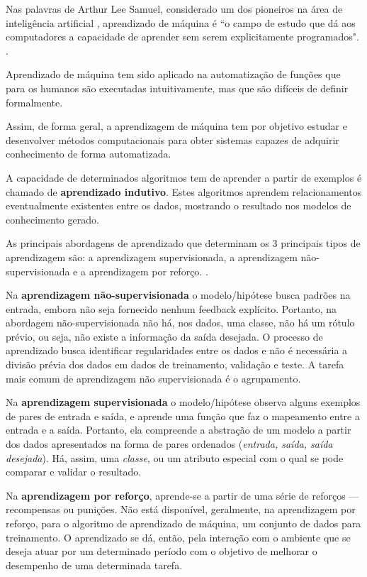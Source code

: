Nas palavras de Arthur Lee Samuel, considerado um dos pioneiros na área de inteligência artificial \cite{wiederhold_arthur_1992}, aprendizado de máquina é ``o campo de estudo que dá aos computadores a capacidade de aprender sem serem explicitamente programados". \cite[p. 89]{simon_too_2013}.

Aprendizado de máquina tem sido aplicado na automatização de funções que para os humanos são executadas intuitivamente, mas que são difíceis de definir formalmente. \cite{sarkar_2017}

Assim, de forma geral, a aprendizagem de máquina tem por objetivo estudar e desenvolver métodos computacionais para obter sistemas capazes de adquirir conhecimento de forma automatizada. \cite{lima_ia_2016}

A capacidade de determinados algoritmos tem de aprender a partir de exemplos é chamado de \textbf{aprendizado indutivo}. Estes algoritmos aprendem relacionamentos eventualmente existentes entre os dados, mostrando o resultado nos modelos de conhecimento gerado. \cite{goldschmidt2005}\cite{alpaydin_introduction_2014}

As principais abordagens de aprendizado que determinam os 3 principais tipos de aprendizagem são: a aprendizagem supervisionada, a aprendizagem não-supervisionada e a aprendizagem por reforço. \cite{Norvig2013}. 

Na \textbf{aprendizagem não-supervisionada} o modelo/hipótese busca padrões na entrada, embora não seja fornecido nenhum feedback explícito. Portanto, na abordagem não-supervisionada não há, nos dados, uma classe, não há um rótulo prévio, ou seja, não existe a informação da saída desejada. O processo de aprendizado busca identificar regularidades entre os dados e não é necessária a divisão prévia dos dados em dados de treinamento, validação e teste.  A tarefa mais comum de aprendizagem não supervisionada é o agrupamento. \cite{Norvig2013} \cite{Boscarioli2017} \cite{goldschmidt2005} \cite{aprenda_mineracao_fernando_amaral16}

Na \textbf{aprendizagem supervisionada} o modelo/hipótese observa alguns exemplos de pares de entrada e saída, e aprende uma função que faz o mapeamento entre a entrada e a saída. Portanto, ela compreende a abstração de um modelo a partir dos dados apresentados na forma de pares ordenados (\textit{entrada, saída, saída desejada}). Há, assim, uma \textit{classe}, ou um atributo especial com o qual se pode comparar e validar o resultado.

Na \textbf{aprendizagem por reforço}, aprende-se a partir de uma série de reforços --- recompensas ou punições. Não está disponível, geralmente, na aprendizagem por reforço, para o algoritmo de aprendizado de máquina, um conjunto de dados para treinamento. O aprendizado se dá, então, pela interação com o ambiente que se deseja atuar por um determinado período com o objetivo de melhorar o desempenho de uma determinada tarefa. \cite{Norvig2013} \cite{aprenda_mineracao_fernando_amaral16} \cite{silva_restaurante_2019}	

